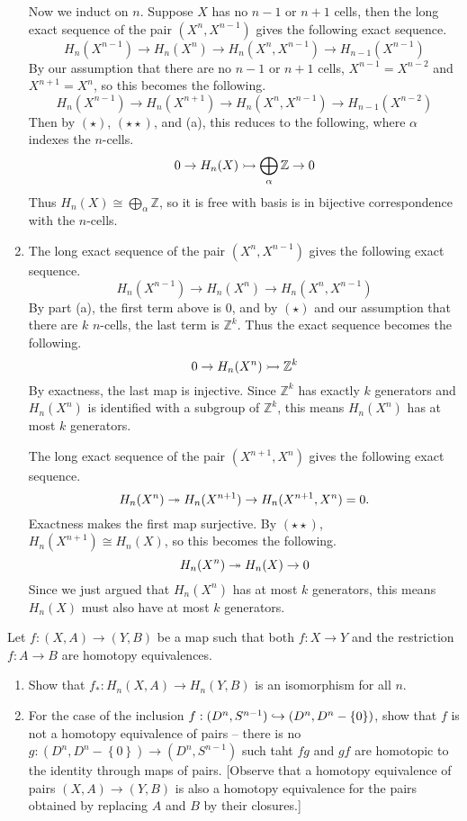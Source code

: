 \documentclass[twoside,10pt]{article}
\begin{document}
\begin{enumerate}
		Now we induct on $n$. Suppose $X$ has no $n-1$ or $n+1$ cells, then the long exact sequence of the pair $(X^{n},X^{n-1})$ gives the following exact sequence.
		\[
			H_{n}(X^{n-1}) \to H_{n}(X^{n}) \to H_{n}(X^{n},X^{n-1}) \to H_{n-1}(X^{n-1})
		\] By our assumption that there are no $n-1$ or $n+1$ cells, $X^{n-1}=X^{n-2}$ and $X^{n+1}=X^{n}$, so this becomes the following.
		\[
                        H_{n}(X^{n-1}) \to H_{n}(X^{n+1}) \to H_{n}(X^{n},X^{n-1}) \to H_{n-1}(X^{n-2})
		\] Then by $(\star)$, $(\star\star)$, and (a), this reduces to the following, where $\alpha$ indexes the $n$-cells.
		\[
			0 \to H_{n}(X) \rightarrowtail \bigoplus_{\alpha}\mathbb{Z} \to 0
		\] 
		Thus $H_{n}(X) \cong \bigoplus_{\alpha}\mathbb{Z}$, so it is free with basis is in bijective correspondence with the $n$-cells.

	\item The long exact sequence of the pair $(X^{n},X^{n-1})$ gives the following exact sequence.
		\[
			H_{n}(X^{n-1}) \to H_{n}(X^{n}) \to H_{n}(X^{n},X^{n-1})
		\] By part (a), the first term above is 0, and by $(\star)$ and our assumption that there are $k$ $n$-cells, the last term is $\mathbb{Z}^{k}$. Thus the exact sequence becomes the following.
		\[
			0 \to H_{n}(X^{n}) \rightarrowtail \mathbb{Z}^{k}
		\] 
		By exactness, the last map is injective. Since $\mathbb{Z}^{k}$ has exactly $k$ generators and $H_{n}(X^{n})$ is identified with a subgroup of $\mathbb{Z}^{k}$, this means $H_{n}(X^{n})$ has at most $k$ generators.

		The long exact sequence of the pair $(X^{n+1},X^{n})$ gives the following exact sequence.
		\[
			H_{n}(X^{n}) \twoheadrightarrow H_{n}(X^{n+1}) \to H_{n}(X^{n+1},X^{n}) = 0.
		\] Exactness makes the first map surjective. By $(\star\star)$, $H_{n}(X^{n+1})\cong H_{n}(X)$, so this becomes the following.
		\[
			H_{n}(X^{n}) \twoheadrightarrow H_{n}(X) \to 0
		\] Since we just argued that $H_{n}(X^{n})$ has at most $k$ generators, this means $H_{n}(X)$ must also have at most $k$ generators.
\end{enumerate}

\newpage

\begin{exer}[2.1: 27]
	Let $f:(X,A)\to (Y,B)$ be a map such that both $f:X\to Y$ and the restriction $f:A\to B$ are homotopy equivalences.
	\begin{enumerate}
		\item Show that $f_{*}:H_{n}(X,A)\to H_{n}(Y,B)$ is an isomorphism for all $n$.
		\item For the case of the inclusion $f:(D^{n},S^{n-1})\hookrightarrow (D^{n},D^{n}-\left\{ 0 \right\})$, show that $f$ is not a homotopy equivalence of pairs -- there is no $g:(D^{n},D^{n}-\left\{ 0 \right\})\to (D^{n},S^{n-1})$ such taht $fg$ and $gf$ are homotopic to the identity through maps of pairs. [Observe that a homotopy equivalence of pairs $(X,A)\to (Y,B)$ is also a homotopy equivalence for the pairs obtained by replacing $A$ and $B$ by their closures.]
	\end{enumerate}
\end{exer}
\end{document}
